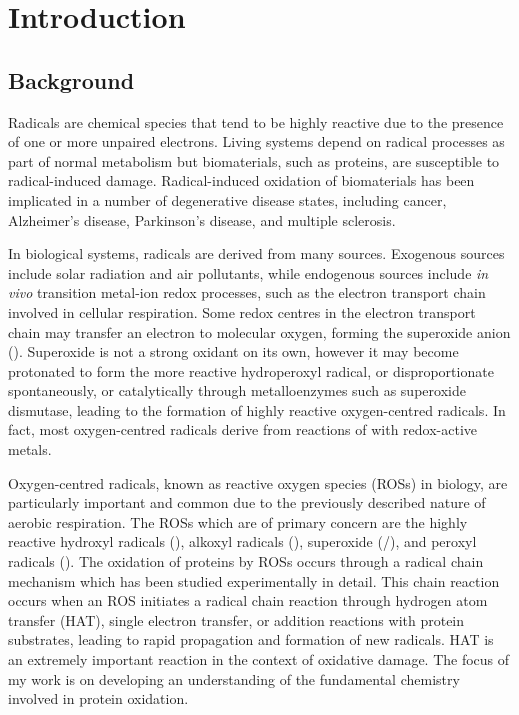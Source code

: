 
\chapter{Introduction}

\section{Background}

Radicals are chemical species that tend to be highly reactive due to the presence of one or more unpaired electrons. Living systems depend on radical processes as part of normal metabolism\cite{Halliwell2015} but biomaterials, such as proteins, are susceptible to radical-induced damage. Radical-induced oxidation of biomaterials has been implicated in a number of degenerative disease states, including cancer, Alzheimer's disease, Parkinson's disease, and multiple sclerosis.\cite{Barnham2004, Valko2007, Hwang2013, Halliwell2007}

In biological systems, radicals are derived from many sources. Exogenous sources include solar radiation and air pollutants, while endogenous sources include \emph{in vivo} transition metal-ion redox processes, such as the electron transport chain involved in cellular respiration.\cite{Turrens2003} Some redox centres in the electron transport chain may transfer an electron to molecular oxygen, forming the superoxide anion (). Superoxide is not a strong oxidant on its own, however it may become protonated to form the more reactive hydroperoxyl radical,\cite{Kozmer2014} or disproportionate spontaneously, or catalytically through metalloenzymes such as superoxide dismutase, leading to the formation of highly reactive oxygen-centred radicals. In fact, most oxygen-centred radicals derive from reactions of  with redox-active metals.\cite{Halliwell2015}

Oxygen-centred radicals, known as reactive oxygen species (ROSs) in biology, are particularly important and common due to the previously described nature of aerobic respiration. The ROSs which are of primary concern are the highly reactive hydroxyl radicals (), alkoxyl radicals (), superoxide (/), and peroxyl radicals ().\cite{Halliwell2015} The oxidation of proteins by ROSs occurs through a radical chain mechanism which has been studied experimentally in detail.\cite{Berlett1997, Davies2016} This chain reaction occurs when an ROS initiates a radical chain reaction through hydrogen atom transfer (HAT), single electron transfer, or addition reactions with protein substrates, leading to rapid propagation and formation of new radicals. HAT is an extremely important reaction in the context of oxidative damage. The focus of my work is on developing an understanding of the fundamental chemistry involved in protein oxidation.

